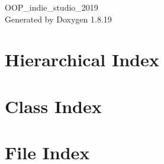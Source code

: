 \let\mypdfximage\pdfximage\def\pdfximage{\immediate\mypdfximage}\documentclass[twoside]{book}
\newcommand{\+}{\discretionary{\mbox{\scriptsize$\hookleftarrow$}}{}{}}
\newcommand{\clearemptydoublepage}{%
  \newpage{\pagestyle{empty}\cleardoublepage}%
}
\begin{document}
\hypersetup{pageanchor=false,
             bookmarksnumbered=true,
             pdfencoding=unicode
            }
\begin{titlepage}
\vspace*{7cm}
\begin{center}%
{\Large O\+O\+P\+\_\+indie\+\_\+studio\+\_\+2019 }\\
\vspace*{1cm}
{\large Generated by Doxygen 1.8.19}\\
\end{center}
\end{titlepage}
\clearemptydoublepage
{}
\tableofcontents
\clearemptydoublepage
{}
\hypersetup{pageanchor=true}

\chapter{Hierarchical Index}

\chapter{Class Index}

\chapter{File Index}

\end{document}
